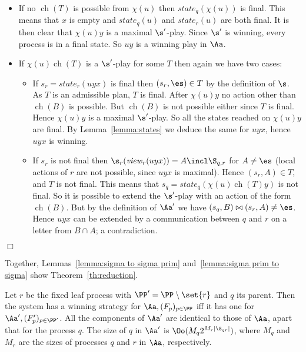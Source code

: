 \documentclass{llncs}
\newcommand{\state}{\mathit{state}}
\newcommand{\view}{\mathit{view}}
\newcommand{\ch}{\mathop{ch}}
\renewenvironment{proof}{{\em Proof. }}{\nopagebreak
  \hspace*{\fill}$\Box$}
\begin{document}
\begin{proof}
  \begin{itemize}
  \item If no $\ch(T)$ is possible from $\chi(u)$ then
    $\state_q(\chi(u))$ is final. This means that $x$ is empty and
    $\state_q(u)$ and $\state_r(u)$ are both final. It is then clear
    that $\chi(u)y$ is a maximal $\s'$-play. Since $\s'$ is winning,
    every process is in a final state. So $uy$ is a winning play in
    $\Aa$.
  \item If $\chi(u)\ch(T)$ is a $\s'$-play for some $T$ then again we
    have two cases:
    \begin{itemize}
    \item If $s_r=\state_r(uyx)$ is final then $(s_r,\es)\in T$ by
      the definition of $\s$. As $T$ is an admissible plan, $T$ is
      final. After $\chi(u)y$ no action other than $\ch(B)$ is
      possible. But $\ch(B)$ is not possible either since $T$ is
      final. Hence $\chi(u)y$ is a maximal $\s'$-play. So all the
      states reached on $\chi(u)y$ are final. By
      Lemma~\ref{lemma:states} we deduce the same for $uyx$, hence
      $uyx$ is winning.
    \item If $s_r$ is not final then $\s_r(\view_r(uyx))=A\incl \S_{q,r}$ for
      $A\not=\es$ (local actions of $r$ are not possible, since $uyx$
      is maximal). Hence $(s_r,A)\in T$, and $T$ is not final. This
      means that $s_q=\state_q(\chi(u)\ch(T)y)$ is not final. So it is
      possible to extend the $\s'$-play with an action of the form $\ch(B)$. But
      by the definition of $\Aa'$ we have $(s_q,B) \bowtie
      (s_r,A)\not=\es$. Hence 
      $uyx$ can be extended by a communication between $q$ and $r$ on
      a letter from $B\cap A$; a contradiction.
    \end{itemize}
  \end{itemize}
\end{proof}

\medskip

Together, Lemmas~\ref{lemma:sigma to sigma prim} and~\ref{lemma:sigma prim to
  sigma} show Theorem~\ref{th:reduction}.


\begin{theorem}\label{th:reduction}
  Let $r$ be the fixed leaf process with $\PP'=\PP\setminus \set{r}$
  and $q$ its parent.  Then the system has a winning strategy for $\Aa,(F_p)_{p\in\PP}$ iff it
  has one for $\Aa',(F'_p)_{p\in\PP'}$. All the components of $\Aa'$
  are identical to those of $\Aa$, apart that for the process $q$. The
  size of $q$ in $\Aa'$ is $\Oo(M_q2^{M_r |\S_{qr}|})$, where $M_q$ and
  $M_r$ are the sizes of processes $q$ and $r$ in $\Aa$, respectively.
\end{theorem}
\end{document}
